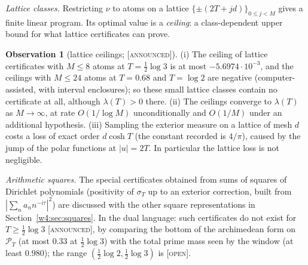 \documentclass[11pt]{amsart}
\theoremstyle{definition}
\newtheorem{observation}[theorem]{Observation}
\theoremstyle{remark}
\numberwithin{equation}{section}
\newcommand{\PT}{\mathcal{P}_T}                        %
\newcommand{\sT}{\sigma_T}                             %
\newcommand{\lam}{\lambda(T)}                          %
\newcommand{\stag}[1]{\textsc{[#1]}}
\newcommand{\OPENQ}{\stag{open}}
\newcommand{\ANNOUNCED}{\stag{announced}}
\begin{document}
\emph{Lattice classes.} Restricting $\nu$ to atoms on a lattice $\{\pm(2T+jd)\}_{0\le j<M}$ gives a finite linear program.
Its optimal value is a \emph{ceiling}: a class-dependent upper bound for what lattice certificates can prove.

\begin{observation}[lattice ceilings; \ANNOUNCED]\label{w5:obs:ceil}
(i) The ceiling of lattice certificates with $M\le8$ atoms at $T=\frac12\log3$ is at most $-5.6974\cdot10^{-3}$, and the
ceilings with $M\le24$ atoms at $T=0.68$ and $T=\log 2$ are negative (computer-assisted, with interval enclosures); so
these small lattice classes contain no certificate at all, although $\lam>0$ there. (ii) The ceilings converge to $\lam$
as $M\to\infty$, at rate $O(1/\log M)$ unconditionally and $O(1/M)$ under an additional hypothesis. (iii) Sampling the
exterior measure on a lattice of mesh $d$ costs a loss of exact order $d\cosh T$ (the constant recorded is $4/\pi$), caused
by the jump of the polar functions at $|u|=2T$. In particular the lattice loss is not negligible.
\end{observation}

\emph{Arithmetic squares.} The special certificates obtained from sums of squares of Dirichlet polynomials (positivity
of $\sT$ up to an exterior correction, built from $|\sum_n a_nn^{-i\tau}|^2$) are discussed with the other square
representations in Section~\ref{w4:sec:squares}. In the dual language: such certificates do not exist for $T\ge\frac12\log3$
\ANNOUNCED, by comparing the bottom of the archimedean form on $\PT$ (at most $0.33$ at $\frac12\log3$) with the total
prime mass seen by the window (at least $0.980$); the range $(\frac12\log2,\frac12\log3)$ is \OPENQ.
\end{document}

